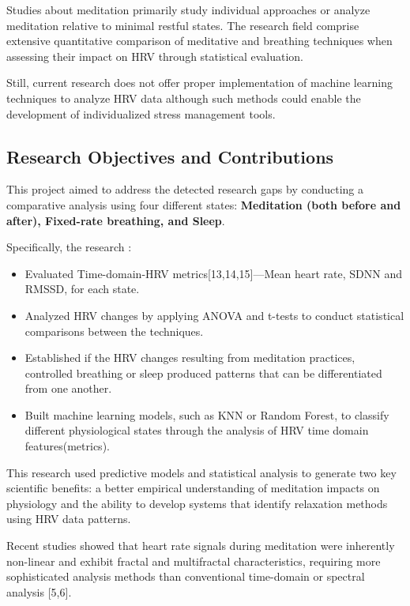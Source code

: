 \documentclass[
  11pt,
]{ieee}
\begin{document}
Studies about meditation primarily study individual approaches or
analyze meditation relative to minimal restful states. The research
field comprise extensive quantitative comparison of meditative and
breathing techniques when assessing their impact on HRV through
statistical evaluation.

Still, current research does not offer proper implementation of machine
learning techniques to analyze HRV data although such methods could
enable the development of individualized stress management tools.

\subsection{Research Objectives and
Contributions}\label{research-objectives-and-contributions}

\vspace{0.8em}

This project aimed to address the detected research gaps by conducting a
comparative analysis using four different states: \textbf{Meditation
(both before and after), Fixed-rate breathing, and Sleep}.

Specifically, the research :

\begin{itemize}
\item
  Evaluated Time-domain-HRV metrics{[}13,14,15{]}---Mean heart rate,
  SDNN and RMSSD, for each state.
\item
  Analyzed HRV changes by applying ANOVA and t-tests to conduct
  statistical comparisons between the techniques.
\item
  Established if the HRV changes resulting from meditation practices,
  controlled breathing or sleep produced patterns that can be
  differentiated from one another.
\item
  Built machine learning models, such as KNN or Random Forest, to
  classify different physiological states through the analysis of HRV
  time domain features(metrics).
\end{itemize}

This research used predictive models and statistical analysis to
generate two key scientific benefits: a better empirical understanding
of meditation impacts on physiology and the ability to develop systems
that identify relaxation methods using HRV data patterns.

Recent studies showed that heart rate signals during meditation were
inherently non-linear and exhibit fractal and multifractal
characteristics, requiring more sophisticated analysis methods than
conventional time-domain or spectral analysis {[}5,6{]}.
\end{document}
